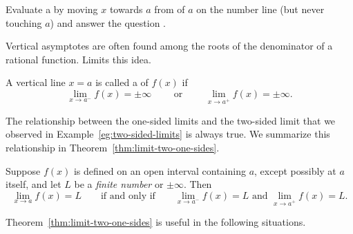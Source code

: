 \documentclass[../main.tex]{subfiles}
\begin{document}
\begin{example} \label{eg:two-sided-limits}
  Evaluate a  by moving \(x\) towards \(a\) from  of \(a\) on the number line (but never touching \(a\)) and answer the question \faStar{}.

  \begin{center}
    
    \qquad
    
    \qquad
    
  \end{center}

  \begin{center}
    
    \qquad
    
    \qquad
    
  \end{center}

\end{example}

Vertical asymptotes are often found among the roots of the denominator of a rational function. Limits  this idea.
\begin{definition} \label{def:vertical-asymptote}
  A vertical line \(x = a\) is called a  of \(f(x)\) if
  \[
    \lim_{x \to a^{-}} f(x) = \pm \infty \qquad\text{ or }\qquad \lim_{x \to a^{+}} f(x) = \pm \infty.
  \]

\end{definition}
\blanks*
\clearpage

The relationship between the one-sided limits and the two-sided limit that we observed in Example~\ref{eg:two-sided-limits} is always true. We summarize this relationship in Theorem~\ref{thm:limit-two-one-sides}.

\begin{thm} \label{thm:limit-two-one-sides}
  Suppose \(f(x)\) is defined on an open interval containing \(a\), except possibly at \(a\) itself, and let \(L\) be a \emph{finite number} or \(\pm\infty\). Then
  \[
    \lim_{x \to a} f(x) = L \qquad\text{if and only if}\qquad \lim_{x \to a^{-}} f(x) = L \text{ and } \lim_{x \to a^{+}} f(x) = L.
  \]

\end{thm}

Theorem~\ref{thm:limit-two-one-sides} is useful in the following situations.
\end{document}
